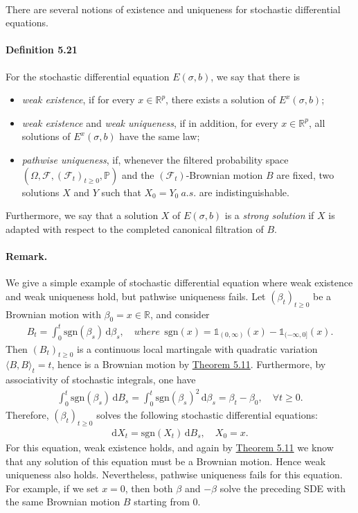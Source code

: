 \documentclass{article}
\numberwithin{equation}{section}
\renewcommand{\P}{\mathbb{P}}
\renewcommand{\d}{\mathrm{d}}
\theoremstyle{plain}
\theoremstyle{definition}
\begin{document}
\paragraph{} There are several notions of existence and uniqueness for stochastic differential equations.

\paragraph{Definition 5.21\label{def:5.21}} For the stochastic differential equation $E(\sigma,b)$, we say that there is
\begin{itemize}
	\item \textit{weak existence}, if for every $x\in\mathbb{R}^p$, there exists a solution of $E^x(\sigma,b)$;
	\item \textit{weak existence} and \textit{weak uniqueness}, if in addition, for every $x\in\mathbb{R}^p$, all solutions
	of $E^x(\sigma,b)$ have the same law;
	\item \textit{pathwise uniqueness}, if, whenever the filtered probability space $(\Omega,\mathscr{F},(\mathscr{F}_t)_{t\geq 0},\P)$ and the $(\mathscr{F}_t)$-Brownian motion $B$ are fixed, two solutions $X$ and $Y$ such that $X_0=Y_0\ a.s.$ are indistinguishable.
\end{itemize}
Furthermore, we say that a solution $X$ of $E(\sigma,b)$ is a \textit{strong solution} if $X$ is adapted with respect to the completed canonical filtration of $B$.

\paragraph{Remark.} We give a simple example of stochastic differential equation where weak existence and weak uniqueness hold, but pathwise uniqueness fails. Let $(\beta_t)_{t\geq 0}$ be a Brownian motion with $\beta_0=x\in\mathbb{R}$, and consider
\begin{align*}
	B_t = \int_0^t\mathrm{sgn}(\beta_s)\,\d\beta_s,\quad\textit{where}\ \ \mathrm{sgn}(x)=\mathds{1}_{(0,\infty)}(x)-\mathds{1}_{(-\infty,0]}(x).
\end{align*}
Then $(B_t)_{t\geq 0}$ is a continuous local martingale with quadratic variation $\langle B,B\rangle_t=t$, hence is a Brownian motion by \hyperref[thm:5.11]{Theorem 5.11}. Furthermore, by associativity of stochastic integrals, one have
\begin{align*}
	\int_0^t \mathrm{sgn}(\beta_s)\,\d B_s=\int_0^t\mathrm{sgn}(\beta_s)^2\,\d\beta_s = \beta_t-\beta_0,\quad\forall t\geq 0.
\end{align*}
Therefore, $(\beta_t)_{t\geq 0}$ solves the following stochastic differential equations:
\begin{align*}
	\d X_t = \mathrm{sgn}(X_t)\,\d B_s,\quad X_0=x.
\end{align*}
For this equation, weak existence holds, and again by \hyperref[thm:5.11]{Theorem 5.11} we know that any solution of this equation must be a Brownian motion. Hence weak uniqueness also holds. Nevertheless, pathwise uniqueness fails for this equation. For example, if we set $x=0$, then both $\beta$ and $-\beta$ solve the preceding SDE with the same Brownian motion $B$ starting from $0$.
\end{document}
